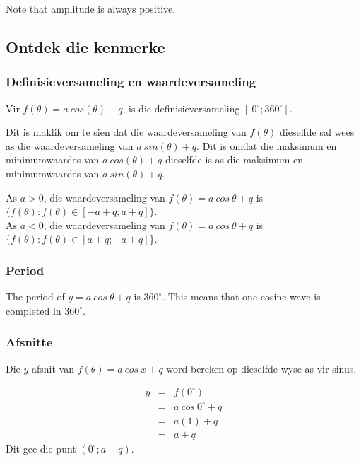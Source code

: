Note that amplitude is always positive.


\subsection*{Ontdek die kenmerke}
\subsubsection*{Definisieversameling en waardeversameling}
\nopagebreak
Vir $f(\theta )=a~cos(\theta )+q$, is die definisieversameling $[~0^{\circ}; 360^{\circ}]$.\par
 
Dit is maklik om te sien dat die waardeversameling van $f(\theta )$ dieselfde sal wees as die waardeversameling van $a~sin(\theta )+q$. Dit is omdat die maksimum en minimumwaardes van $a~cos(\theta )+q$ dieselfde is as die maksimum en minimumwaardes van $a~sin(\theta )+q$.\par 
As $a>0$, die waardeversameling van $f(\theta)=a~cos~\theta+q$ is $\{f(\theta): f(\theta) \in [-a+q; a+q]\}$. \\
As $a<0$, die waardeversameling van $f(\theta)=a~cos~\theta+q$ is $\{f(\theta): f(\theta) \in [a+q; -a+q]\}$.
\subsubsection*{Period}
The period of $y=a~cos~\theta+q$ is $360^{\circ}$. This means that one cosine wave is completed in $360^{\circ}$. 
\subsubsection*{Afsnitte}
\nopagebreak
Die $y$-afsnit van $f(\theta )=a~cos~x+q$ word bereken op dieselfde wyse as vir sinus.\par 
\nopagebreak\noindent{}
\begin{eqnarray*}
  y &=& f({0}^{\circ}) \\
    &=& a~cos~ 0^{\circ } + q \\
    &=& a(1) + q \\
    &=& a + q
\end{eqnarray*}
Dit gee die punt $(0^{\circ};a+q)$.

